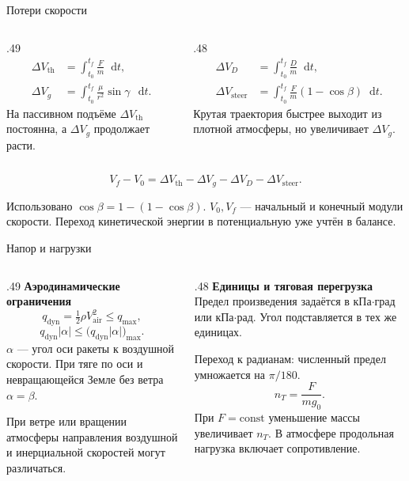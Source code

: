 \documentclass[11pt,aspectratio=169,t]{beamer}
\newcommand{\eqcompact}{\fontsize{10}{12}\selectfont}
\newcommand{\figcaption}[1]{{\usebeamerfont{caption}\color{coursemuted}#1\par}}
\newcommand{\derivationmathspacing}{%
  \setlength{\abovedisplayskip}{2pt}%
  \setlength{\belowdisplayskip}{3pt}%
  \setlength{\abovedisplayshortskip}{2pt}%
  \setlength{\belowdisplayshortskip}{2pt}%
  \setlength{\jot}{2pt}}
\newcommand{\dd}{\mathop{}\!\mathrm d}
\begin{document}
\begin{frame}{Потери скорости}
\relax\derivationmathspacing
\begin{columns}[T,onlytextwidth]
\begin{column}{.49\textwidth}
{\eqcompact
\[
\begin{aligned}
 \Delta V_{\mathrm{th}}&=\int_{t_0}^{t_f}\frac Fm\dd t,\\
 \Delta V_g&=\int_{t_0}^{t_f}\frac\mu{r^2}\sin\gamma\,\dd t.
\end{aligned}
\]
}
На пассивном подъёме $\Delta V_{\mathrm{th}}$ постоянна,
а $\Delta V_g$ продолжает расти.
\end{column}
\begin{column}{.48\textwidth}
{\eqcompact
\[
\begin{aligned}
 \Delta V_D&=\int_{t_0}^{t_f}\frac Dm\dd t,\\
 \Delta V_{\mathrm{steer}}&=\int_{t_0}^{t_f}\frac Fm(1-\cos\beta)\dd t.
\end{aligned}
\]
}
Крутая траектория быстрее выходит из плотной атмосферы,
но увеличивает $\Delta V_g$.
\end{column}
\end{columns}
{\eqcompact
\[
 \boxed{V_f-V_0=\Delta V_{\mathrm{th}}-\Delta V_g-\Delta V_D-\Delta V_{\mathrm{steer}}.}
\]
}
\figcaption{Использовано $\cos\beta=1-(1-\cos\beta)$.
$V_0,V_f$ --- начальный и конечный модули скорости.
Переход кинетической энергии в потенциальную уже учтён в балансе.}
\end{frame}

\begin{frame}{Напор и нагрузки}
\relax\derivationmathspacing
\begin{columns}[T,onlytextwidth]
\begin{column}{.49\textwidth}
\textbf{Аэродинамические ограничения}
{\eqcompact
\[
 q_{\mathrm{dyn}}=\tfrac12\rho V_{\mathrm{air}}^2\le q_{\max},
\]
\[
 q_{\mathrm{dyn}}|\alpha|\le
       \bigl(q_{\mathrm{dyn}}|\alpha|\bigr)_{\max}.
\]
}
$\alpha$ --- угол оси ракеты к воздушной скорости.
При тяге по оси и невращающейся Земле без ветра $\alpha=\beta$.
\par\smallskip
При ветре или вращении атмосферы направления воздушной и инерциальной скоростей могут различаться.
\end{column}
\begin{column}{.48\textwidth}
\textbf{Единицы и тяговая перегрузка}
Предел произведения задаётся в кПа$\cdot$град или кПа$\cdot$рад.
Угол подставляется в тех же единицах.
\par\smallskip
Переход к радианам: численный предел умножается на $\pi/180$.
{\eqcompact
\[
 \boxed{n_T=\frac F{mg_0}.}
\]
}
При $F=\mathrm{const}$ уменьшение массы увеличивает $n_T$.
В атмосфере продольная нагрузка включает сопротивление.
\end{column}
\end{columns}
\end{frame}
\end{document}
